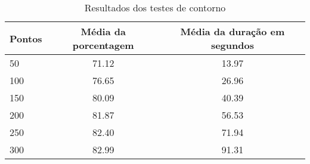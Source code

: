 \begin{table}[h]
    \centering
    \caption{Resultados dos testes de contorno}
    \label{tab:resultados-contorno}
    \begin{tabular}{|l|c|c|}
        \hline
        {Pontos} & {Média da porcentagem} & {Média da duração em segundos} \\
        \hline
        50  & 71.12 & 13.97\\
        100 & 76.65 & 26.96\\
        150 & 80.09 & 40.39\\
        200 & 81.87 & 56.53\\
        250 & 82.40 & 71.94\\
        300 & 82.99 & 91.31\\
        \hline
    \end{tabular}
\end{table}